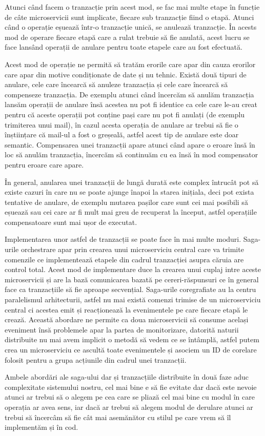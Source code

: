 Atunci când facem o tranzacție prin acest mod, se fac mai multe etape în funcție de câte 
microservicii sunt implicate, fiecare sub tranzacție fiind o etapă. Atunci când o operație eșuează
într-o tranzacție unică, se anulează tranzacție. În acests mod de operare fiecare etapă care a rulat
trebuie să fie anulată, acest lucru se face lansând operații de anulare pentru toate etapele 
care au fost efectuată.

Acest mod de operație ne permită să tratăm erorile care apar din cauza erorilor care apar
din motive condiționate de date și nu tehnic. Există două tipuri de anulare, cele care încearcă
să anuleze tranzacția și cele care încearcă să compenseze tranzacția. De exemplu atunci când încercăm
să anulăm tranzacția lansăm operații de anulare însă acestea nu pot fi identice ca cele care le-au creat
pentru că aceste operații pot conține pași care nu pot fi anulați (de exemplu trimiterea unui mail),
în cazul acesta operația de anulare ar trebui să fie o înștiințare că mail-ul a fost o greșeală,
astfel acest tip de anulare este doar semantic. Compensarea unei tranzacții apare atunci când
apare o eroare însă în loc să anulăm tranzacția, încercăm să continuăm cu ea însă în mod compensator
pentru eroare care apare.

În general, anularea unei tranzacții de lungă durată este complex întrucât pot să existe cazuri
în care nu se poate ajunge înapoi la starea inițiala, deci pot exista tentative de anulare,
de exemplu mutarea pașilor care sunt cei mai posibili să eșuează sau cei care ar fi mult mai greu
de recuperat la început, astfel operațiile compensatoare sunt mai ușor de executat.

Implementarea unor astfel de tranzacții se poate face în mai multe moduri. Saga-urile orchestrare
apar prin crearea unui microserviciu central care va trimite comenzile ce implementează etapele
din cadrul tranzacției asupra căruia are control total. Acest mod de implementare duce la crearea
unui cuplaj intre aceste microservicii și are la bază comunicarea bazată pe cereri-răspunsuri
ce în general face ca tranzacțiile să fie aproape secvențial. Saga-urile coregrafiate au la centru
paralelismul arhitecturii, astfel nu mai există comenzi trimise de un microserviciu central
ci acestea emit și reacționează la evenimentele pe care fiecare etapă le crează. Această abordare
ne permite ca doua microservicii să consume același eveniment însă problemele apar la partea de monitorizare,
datorită naturii distribuite nu mai avem implicit o metodă să vedem ce se întâmplă, astfel
putem crea un microserviciu ce ascultă toate evenimentele și asociem un ID de corelare folosit
pentru a grupa acțiunile din cadrul unei tranzacții.

Ambele abordări ale saga-ului dar și tranzacțiile distribuite în două faze aduc complexitate
sistemului nostru, cel mai bine e să fie evitate dar dacă este nevoie atunci ar trebui să o
alegem pe cea care se pliază cel mai bine cu modul în care operația ar avea sens, iar dacă
ar trebui să alegem modul de derulare atunci ar trebui să încercâm să fie cât mai asemănător
cu stilul pe care vrem să îl implementăm și în cod.

